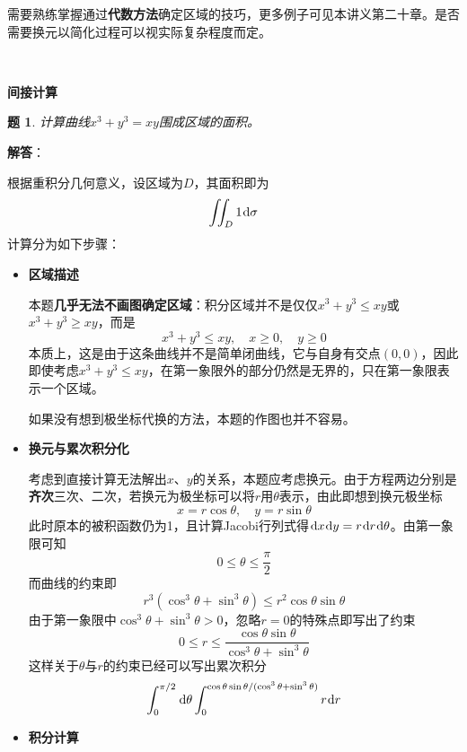 \documentclass[a4paper,UTF8,fontset=windows,AutoFakeBold]{ctexart}
\newcommand*{\dr}{\hspace{0.07em}\mathrm{d}}
\newcommand*{\note}{\noindent *}
\theoremstyle{ex}
\newtheorem{exercise}{题}
\newcommand{\sol}[1]{{\vspace{5pt}\kaishu\noindent\textbf{解答}：\vspace{-3pt}
\begin{compactitem}
    \item[] #1
\end{compactitem}
}}
\begin{document}
\note 需要熟练掌握通过\textbf{代数方法}确定区域的技巧，更多例子可见本讲义第二十章。是否需要换元以简化过程可以视实际复杂程度而定。

\

\noindent\textbf{间接计算}
\begin{framed}
\begin{exercise}
    计算曲线$x^3+y^3=xy$围成区域的面积。
\end{exercise}
\sol{
    根据重积分几何意义，设区域为$D$，其面积即为
    $$\iint_D1\dr\sigma$$
    计算分为如下步骤：
    \begin{itemize}
        \item \textbf{区域描述}
        
        本题\textbf{几乎无法不画图确定区域}：积分区域并不是仅仅$x^3+y^3\le xy$或$x^3+y^3\ge xy$，而是
        $$x^3+y^3\le xy,\quad x\ge0,\quad y\ge0$$
        本质上，这是由于这条曲线并不是简单闭曲线，它与自身有交点$(0,0)$，因此即使考虑$x^3+y^3\le xy$，在第一象限外的部分仍然是无界的，只在第一象限表示一个区域。

        \note 如果没有想到极坐标代换的方法，本题的作图也并不容易。

        \item \textbf{换元与累次积分化}
        
        考虑到直接计算无法解出$x$、$y$的关系，本题应考虑换元。由于方程两边分别是\textbf{齐次}三次、二次，若换元为极坐标可以将$r$用$\theta$表示，由此即想到换元极坐标
        $$x=r\cos\theta,\quad y=r\sin\theta$$
        此时原本的被积函数仍为1，且计算Jacobi行列式得$\dr x\dr y=r\dr r\dr\theta$。由第一象限可知
        $$0\le\theta\le\frac{\pi}{2}$$
        而曲线的约束即
        $$r^3(\cos^3\theta+\sin^3\theta)\le r^2\cos\theta\sin\theta$$
        由于第一象限中$\cos^3\theta+\sin^3\theta>0$，忽略$r=0$的特殊点即写出了约束
        $$0\le r\le\frac{\cos\theta\sin\theta}{\cos^3\theta+\sin^3\theta}$$
        这样关于$\theta$与$r$的约束已经可以写出累次积分
        $$\int_0^{\pi/2}\dr\theta\int_0^{\cos\theta\sin\theta/(\cos^3\theta+\sin^3\theta)}r\dr r$$

        \item \textbf{积分计算}
        

\end{itemize}}
\end{framed}
\end{document}
